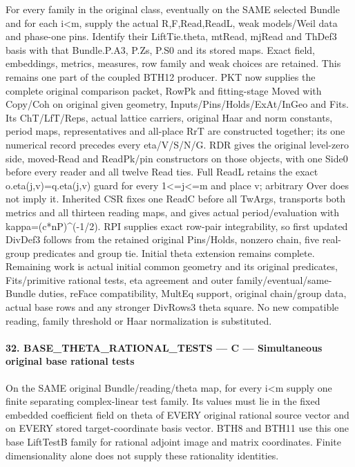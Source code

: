 For every family in the original class, eventually on the SAME selected Bundle and for each i<m, supply the actual R,F,Read,ReadL, weak models/\allowbreak{}Weil data and phase-one pins. Identify their LiftTie.theta, mtRead, mjRead and ThDef3 basis with that Bundle.P.A3, P.Zs, P.S0 and its stored maps. Exact field, embeddings, metrics, measures, row family and weak choices are retained. This remains one part of the coupled BTH12 producer. PKT now supplies the complete original comparison packet, RowPk and fitting-stage Moved with Copy/\allowbreak{}Coh on original given geometry, Inputs/\allowbreak{}Pins/\allowbreak{}Holds/\allowbreak{}ExAt/\allowbreak{}InGeo and Fits. Its ChT/\allowbreak{}LfT/\allowbreak{}Reps, actual lattice carriers, original Haar and norm constants, period maps, representatives and all-place RrT are constructed together; its one numerical record precedes every eta/\allowbreak{}V/\allowbreak{}S/\allowbreak{}N/\allowbreak{}G. RDR gives the original level-zero side, moved-Read and ReadPk/\allowbreak{}pin constructors on those objects, with one Side0 before every reader and all twelve Read ties. Full ReadL retains the exact o.eta(j,v)=q.eta(j,v) guard for every 1<=j<=m and place v; arbitrary Over does not imply it. Inherited CSR fixes one ReadC before all TwArgs, transports both metrics and all thirteen reading maps, and gives actual period/\allowbreak{}evaluation with kappa=(c*nP)\textasciicircum{}(-1/\allowbreak{}2). RPI supplies exact row-pair integrability, so first updated DivDef3 follows from the retained original Pins/\allowbreak{}Holds, nonzero chain, five real-group predicates and group tie. Initial theta extension remains complete. Remaining work is actual initial common geometry and its original predicates, Fits/\allowbreak{}primitive rational tests, eta agreement and outer family/\allowbreak{}eventual/\allowbreak{}same-Bundle duties, reFace compatibility, MultEq support, original chain/\allowbreak{}group data, actual base rows and any stronger DivRows3 theta square. No new compatible reading, family threshold or Haar normalization is substituted.

\paragraph{32. BASE\_\allowbreak{}THETA\_\allowbreak{}RATIONAL\_\allowbreak{}TESTS — C — Simultaneous original base rational tests}

On the SAME original Bundle/\allowbreak{}reading/\allowbreak{}theta map, for every i<m supply one finite separating complex-linear test family. Its values must lie in the fixed embedded coefficient field on theta of EVERY original rational source vector and on EVERY stored target-coordinate basis vector. BTH8 and BTH11 use this one base LiftTestB family for rational adjoint image and matrix coordinates. Finite dimensionality alone does not supply these rationality identities.

